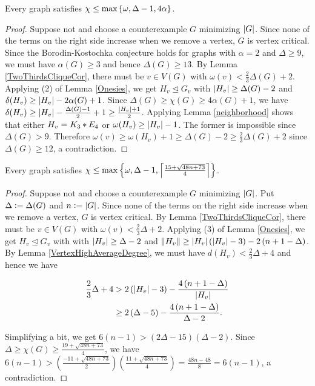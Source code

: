 \begin{thm}\label{AlphaBound}
Every graph satisfies $\chi \leq \max\left\{ \omega, \Delta - 1, 4\alpha \right\}$.
\end{thm}
\begin{proof}
Suppose not and choose a counterexample $G$ minimizing $\left|G\right|$.  Since none of the terms on the right side increase when we remove a vertex, $G$ is vertex critical.  Since the Borodin-Kostochka conjecture holds for graphs with $\alpha = 2$ and $\Delta \geq 9$, we must have $\alpha(G) \geq 3$ and hence $\Delta(G) \geq 13$.  By Lemma \ref{TwoThirdsCliqueCor}, there must be $v \in V(G)$ with $\omega(v) < \frac23 \Delta(G) + 2$.  Applying (2) of Lemma \ref{Onesies}, we get $H_v \unlhd G_v$ with $\left|H_v\right| \geq \Delta(G) - 2$ and $\delta(H_v) \geq \left|H_v\right| - 2\alpha(G) + 1$.  Since $\Delta(G) \geq \chi(G) \geq 4\alpha(G) + 1$, we have $\delta(H_v) \geq \left|H_v\right| - \frac{\Delta(G) - 1}{2} + 1 \geq \frac{\left|H_v\right| + 1}{2}$.  Applying Lemma \ref{neighborhood} shows that either $H_v = K_3 \mbox{\hspace{2 pt}$\ast$\hspace{2 pt}} E_4$ or $\omega(H_v) \geq \left|H_v\right| - 1$.  The former is impossible since $\Delta(G) > 9$. Therefore $\omega(v) \geq \omega(H_v) + 1 \geq \Delta(G) - 2 \geq \frac23 \Delta(G) + 2$ since $\Delta(G) \geq 12$, a contradiction.
\end{proof}

\begin{thm}\label{OrderBound}
Every graph satisfies $\chi \leq \max\left\{ \omega, \Delta - 1, \left\lceil\frac{15 + \sqrt{48n + 73}}{4}\right\rceil \right\}$.
\end{thm}
\begin{proof}
Suppose not and choose a counterexample $G$ minimizing $\left|G\right|$.  Put $\Delta \mathrel{\mathop:}= \Delta(G)$ and $n \mathrel{\mathop:}= \left|G\right|$. Since none of the terms on the right side increase when we remove a vertex, $G$ is vertex critical. By Lemma \ref{TwoThirdsCliqueCor}, there must be $v \in V(G)$ with $\omega(v) < \frac23 \Delta + 2$.  Applying (3) of Lemma \ref{Onesies}, we get $H_v \unlhd G_v$ with with $\left|H_v\right| \geq \Delta - 2$ and $\left\Vert H_v\right\Vert \geq \left|H_v\right|\left( \left|H_v\right|- 3 \right) - 2\left( n + 1 - \Delta \right)$.  By Lemma \ref{VertexHighAverageDegree}, we must have $d(H_v) < \frac23\Delta + 4$ and hence we have

\begin{align*}
\frac23\Delta + 4 &> 2\left( \left|H_v\right|- 3 \right) - \frac{4\left( n + 1 - \Delta \right)}{\left|H_v\right|}\\
&\geq 2\left( \Delta - 5 \right) - \frac{4\left( n + 1 - \Delta \right)}{\Delta - 2}.\\
\end{align*}

Simplifying a bit, we get $6(n-1) > (2\Delta - 15)(\Delta - 2)$.  Since $\Delta \geq \chi(G) \geq \frac{19 + \sqrt{48n + 73}}{4}$, we have $6(n-1) > (\frac{-11 + \sqrt{48n + 73}}{2})(\frac{11 + \sqrt{48n + 73}}{4}) = \frac{48n - 48}{8} = 6(n-1)$, a contradiction.
\end{proof}
